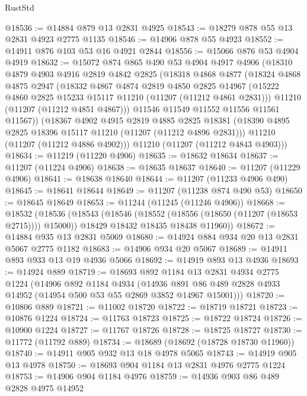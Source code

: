 \begin{lexlean}{RustStd}
\begin{coremodule}
@18536 := @14884 @879 @13 @2831 @4925
@18543 := @18279 @878 @55 @13 @2831 @4923 @2775 @1135
@18546 := @14906 @878 @55 @4923
@18552 := @14911 @876 @103 @53 @16 @4921 @2844
@18556 := @15066 @876 @53 @4904 @4919
@18632 := @15072
    @874
    @865
    @490
    @53
    @4904
    @4917
    @4906
    (@18310
      @4879
      @4903
      @4916
      @2819
      @4842
      @2825
      (@18318
        @4868
        @4877
        (@18324
          @4868
          @4875
          @2947
          (@18332
            @4867
            @4874
            @2819
            @4850
            @2825
            @14967
            (@15222 @4860 @2825 @15233 @15117 @11210 (@11207 (@11212 @4861 @2831)))
            @11210
            (@11207 (@11212 @4851 @4867)))
          @11546
          @11549
          @11552
          @11556
          @11561
          @11567))
      (@18367
        @4902
        @4915
        @2819
        @4885
        @2825
        @18381
        (@18390 @4895 @2825 @18396 @15117 @11210 (@11207 (@11212 @4896 @2831)))
        @11210
        (@11207 (@11212 @4886 @4902)))
      @11210
      (@11207 (@11212 @4843 @4903)))
@18634 := @11219 (@11220 @4906)
@18635 := @18632 @18634
@18637 := @11207 (@11224 @4906)
@18638 := @18635 @18637
@18640 := @11207 (@11229 @4906)
@18641 := @18638 @18640
@18644 := @11207 (@11233 @4906 @490)
@18645 := @18641 @18644
@18649 := @11207 (@11238 @874 @490 @53)
@18650 := @18645 @18649
@18653 := @11244 (@11245 (@11246 @4906))
@18668 := @18532
    (@18536
      (@18543
        (@18546 (@18552 (@18556 (@18650 (@11207 (@18653 @2715)))) @15000))
        @18429
        @18432
        @18435
        @18438
        @11960))
@18672 := @14884 @935 @13 @2831 @5069
@18680 := @14924 @884 @934 @20 @13 @2831 @5067 @2775 @1182
@18683 := @14906 @934 @20 @5067
@18689 := @14911 @893 @933 @13 @19 @4936 @5066
@18692 := @14919 @893 @13 @4936
@18693 := @14924 @889
@18719 := @18693
    @892
    @1184
    @13
    @2831
    @4934
    @2775
    @1224
    (@14906
      @892
      @1184
      @4934
      (@14936 @891 @86 @489 @2828 @4933 @14952 (@14954 @500 @53 @55 @2869 @3852 @14967 @15001)))
@18720 := @10806 @889
@18721 := @11002 @18720
@18722 := @18719 @18721
@18723 := @10876 @1224
@18724 := @11763 @18723
@18725 := @18722 @18724
@18726 := @10900 @1224
@18727 := @11767 @18726
@18728 := @18725 @18727
@18730 := @11772 (@11792 @889)
@18734 := @18689 (@18692 (@18728 @18730 @11960))
@18740 := @14911 @905 @932 @13 @18 @4978 @5065
@18743 := @14919 @905 @13 @4978
@18750 := @18693 @904 @1184 @13 @2831 @4976 @2775 @1224
@18753 := @14906 @904 @1184 @4976
@18759 := @14936 @903 @86 @489 @2828 @4975 @14952

\end{coremodule}
\end{lexlean}
